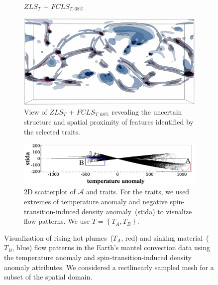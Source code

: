 \begin{figure}[!h]
\begin{subfigure}{0.195\linewidth}
\vspace{-5mm}
\caption{$ZLS_{T}$ + $FCLS_{T,68\%}$}
\label{fig:mantel_fls}
\end{subfigure}
\begin{subfigure}{0.29\linewidth}
\centering
\includegraphics[width=0.9\linewidth]{Images/Mantel/fcls_68_v2.pdf}
\caption{View of $ZLS_{T}$ + $FCLS_{T,68\%}$ revealing the uncertain structure and spatial proximity of features identified by the selected traits.}
\label{fig:mantel_fcls}
\end{subfigure}
\hfill
\begin{subfigure}{0.295\linewidth}
\centering
\includegraphics[width=\linewidth]{Images/Mantel/scatterplot.pdf}
\caption{2D scatterplot of $\mathcal{A}$ and traits. For the traits, we used extremes of temperature anomaly and negative spin-transition-induced density anomaly~(stida) to visualize flow patterns. We use $T = \left\{T_{A}, T_{B}\right\}$.} 
\label{fig:mantel_scatterplot}
\end{subfigure}
\vspace{-2mm}
\caption{Visualization of rising hot plumes~($T_{A}$, red) and sinking material~($T_{B}$, blue) flow patterns in the Earth's mantel convection data using the temperature anomaly and spin-transition-induced density anomaly attributes. We considered a rectlinearly sampled mesh for a subset of the spatial domain.}
\label{fig:mantel}
\end{figure}
